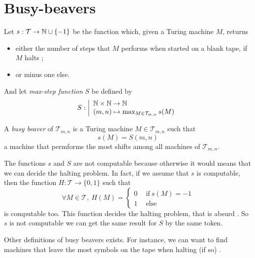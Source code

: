 \documentclass{report}
\begin{document}
\section{Busy-beavers}
\label{sec:bb}

Let $s : \mathcal{T} \to \mathbb{N} \cup \{-1\}$ be the function which, given a Turing machine $M$, returns
\begin{itemize}
\item either the number of steps that $M$ performs when started on a blank tape, if $M$ halts ;
\item or minus one else.
\end{itemize}

\noindent And let \emph{max-step function} $S$ be defined by
\[
S : \left |
  \begin{array}{l}
    \mathbb{N} \times \mathbb{N} \to \mathbb{N}\\
    (m,n) \mapsto \max_{M \in \mathcal{T}_{m,n}} s(M)
  \end{array}
\right .
\]


\noindent A \emph{busy beaver} of $\mathcal{T}_{m,n}$ is a Turing machine $M \in \mathcal{T}_{m,n}$ such that \[s(M) = S(m,n)\] \ie a machine that permforms the most shifts among all machines of $\mathcal{T}_{m,n}$.

\begin{Rem}
  The functions $s$ and $S$ are not computable because otherwise it would means that we can decide the halting problem. In fact, if we assume that $s$ is computable, then the function $H : \mathcal{T} \to \{0,1\}$ such that
  \[
  \forall M \in \mathcal{T},\ H(M) =
  \left \{
    \begin{array}{l}
      0\quad \ \text{if}\ s(M) = -1\\
      1\quad \ \text{else} 
    \end{array}
  \right .
  \]
  is computable too. This function decides the halting problem, that is absurd \cite{turing}. So $s$ is not computable we can get the same result for $S$ by the same token.
\end{Rem}

\begin{Rem}
  Other definitions of busy beavers exists. For instance, we can want to find machines that leave the most symbols on the tape when halting (if so) \cite{rado}.  
\end{Rem}

\end{document}
